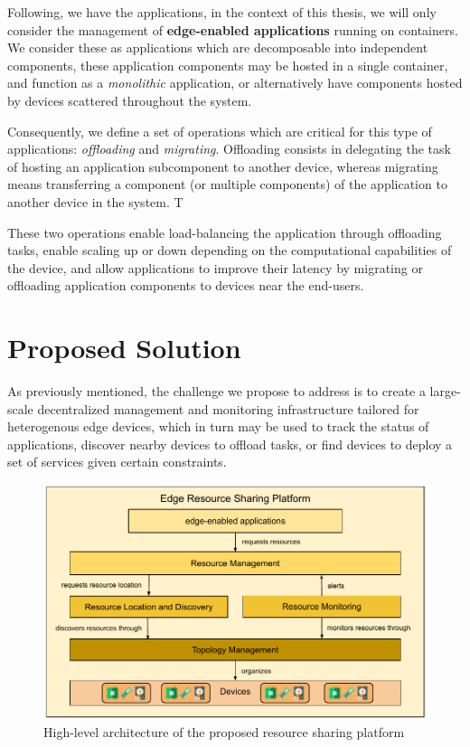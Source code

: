 Following, we have the applications, in the context of this thesis, we will only consider the management of \textbf{edge-enabled applications} running on containers. We consider these as applications which are decomposable into independent components, these application components may be hosted in a single container, and function as a \textit{monolithic} application, or alternatively have components hosted by devices scattered throughout the system. 

Consequently, we define a set of operations which are critical for this type of applications: \textit{offloading} and \textit{migrating}. Offloading consists in delegating the task of hosting an application subcomponent to another device, whereas migrating means transferring a component (or multiple components) of the application to another device in the system. T

These two operations enable load-balancing the application through offloading tasks, enable scaling up or down depending on the computational capabilities of the device, and allow applications to improve their latency by migrating or offloading application components to devices near the end-users. 

\section{Proposed Solution}
\label{cha:proposed_sol}

As previously mentioned, the challenge we propose to address is to create a large-scale decentralized management and monitoring infrastructure tailored for heterogenous edge devices, which in turn may be used to track the status of applications, discover nearby devices to offload tasks, or find devices to deploy a set of services given certain constraints. 

\begin{figure}
    \centering
    \includegraphics[width=0.9\linewidth]{Figures/proposed_architecture_detailed.pdf}
    \caption{High-level architecture of the proposed resource sharing platform}
    \label{fig:proposed_architecture_detailed}
\end{figure}

